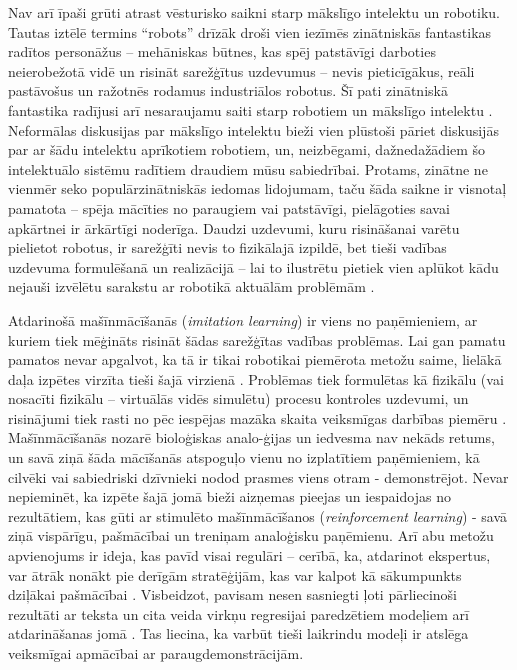 \documentclass[12pt, a4paper]{article}
\numberwithin{equation}{section} %
\begin{document}
Nav arī īpaši grūti atrast vēsturisko saikni starp mākslīgo intelektu un robotiku. Tautas iztēlē termins ``robots'' drīzāk droši vien iezīmēs zinātniskās fantastikas radītos personāžus -- mehāniskas būtnes, kas spēj patstāvīgi darboties neierobežotā vidē un risināt sarežģītus uzdevumus -- nevis pieticīgākus, reāli pastāvošus un ražotnēs rodamus industriālos robotus. Šī pati zinātniskā fantastika radījusi arī nesaraujamu saiti starp robotiem un mākslīgo intelektu \cite{asimov2004robot}. Neformālas diskusijas par mākslīgo intelektu bieži vien plūstoši pāriet diskusijās par ar šādu intelektu aprīkotiem robotiem, un, neizbēgami, dažnedažādiem šo intelektuālo sistēmu radītiem draudiem mūsu sabiedrībai. Protams, zinātne ne vienmēr seko populārzinātniskās iedomas lidojumam, taču šāda saikne ir visnotaļ pamatota -- spēja mācīties no paraugiem vai patstāvīgi, pielāgoties savai apkārtnei ir ārkārtīgi noderīga. Daudzi uzdevumi, kuru risināšanai varētu pielietot robotus, ir sarežģīti nevis to fizikālajā izpildē, bet tieši vadības uzdevuma formulēšanā un realizācijā -- lai to ilustrētu pietiek vien aplūkot kādu nejauši izvēlētu sarakstu ar robotikā aktuālām problēmām \cite{popsci}.

Atdarinošā mašīnmācīšanās (\textit{imitation learning}) ir viens no paņēmieniem, ar kuriem tiek mēģināts risināt šādas sarežģītas vadības problēmas. Lai gan pamatu pamatos nevar apgalvot, ka tā ir tikai robotikai piemērota metožu saime, lielākā daļa izpētes virzīta tieši šajā virzienā \cite{attia2018global}. Problēmas tiek formulētas kā fizikālu (vai nosacīti fizikālu -- virtuālās vidēs simulētu) procesu kontroles uzdevumi, un risinājumi tiek rasti no pēc iespējas mazāka skaita veiksmīgas darbības piemēru \cite{attia2018global}. Mašīnmācīšanās nozarē bioloģiskas analo-ģijas un iedvesma nav nekāds retums, un savā ziņā šāda mācīšanās  atspoguļo vienu no izplatītiem paņēmieniem, kā cilvēki vai sabiedriski dzīvnieki nodod prasmes viens otram - demonstrējot. Nevar nepieminēt, ka izpēte šajā jomā bieži aizņemas pieejas un iespaidojas no rezultātiem, kas gūti ar stimulēto mašīnmācīšanos (\textit{reinforcement learning}) - savā ziņā vispārīgu, pašmācībai un treniņam analoģisku paņēmienu. Arī abu metožu apvienojums ir ideja, kas pavīd visai regulāri -- cerībā, ka, atdarinot ekspertus, var ātrāk nonākt pie derīgām stratēģijām, kas var kalpot kā sākumpunkts dziļākai pašmācībai \cite{hester2018deep}. Visbeidzot, pavisam nesen sasniegti ļoti pārliecinoši rezultāti ar teksta un cita veida virkņu regresijai paredzētiem modeļiem arī atdarināšanas jomā \cite{reed2022generalist}. Tas liecina, ka varbūt tieši laikrindu modeļi ir atslēga veiksmīgai apmācībai ar paraugdemonstrācijām.
\end{document}
